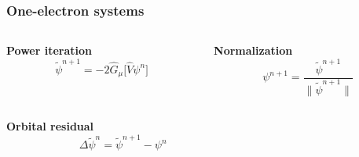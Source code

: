 \documentclass[mathserif, 10pt]{beamer}
\begin{document}
\begin{frame}
    \frametitle{One-electron systems}
    \begin{columns}
    \begin{column}{.50\textwidth}
    \centering
    \textbf{Power iteration}
    \begin{equation}
	\nonumber
	\tilde{\psi}^{n+1} = -2\hat{G}_\mu \Big[ \hat{V} \psi^n \Big]
    \end{equation}
    \end{column}

    \begin{column}{.50\textwidth}
    \centering
    \textbf{Normalization}
    \begin{equation}
	\nonumber
	\psi^{n+1} = \frac{\tilde{\psi}^{n+1}}{\| \tilde{\psi}^{n+1} \|}
    \end{equation}
    \end{column}
    \end{columns}

    \vspace{5mm}

    \begin{columns}
    \begin{column}{.50\textwidth}
    \centering
    \textbf{Orbital residual}
    \begin{equation}
	\nonumber
	\Delta\tilde{\psi}^n = \tilde{\psi}^{n+1} - \psi^n
    \end{equation}
    \end{column}
    \begin{column}{.50\textwidth}
    \end{column}
    \end{columns}
    


\end{frame}
\end{document}
